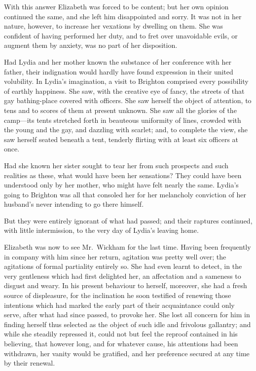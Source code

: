 With this answer Elizabeth was forced to be content; but her
own opinion continued the same, and she left him disappointed
and sorry.  It was not in her nature, however, to increase her
vexations by dwelling on them.  She was confident of having
performed her duty, and to fret over unavoidable evils, or
augment them by anxiety, was no part of her disposition.

Had Lydia and her mother known the substance of her conference
with her father, their indignation would hardly have found
expression in their united volubility.  In Lydia's imagination,
a visit to Brighton comprised every possibility of earthly
happiness.  She saw, with the creative eye of fancy, the streets
of that gay bathing-place covered with officers.  She saw
herself the object of attention, to tens and to scores of them
at present unknown.  She saw all the glories of the camp---its
tents stretched forth in beauteous uniformity of lines, crowded
with the young and the gay, and dazzling with scarlet; and, to
complete the view, she saw herself seated beneath a tent, tenderly
flirting with at least six officers at once.

Had she known her sister sought to tear her from such prospects
and such realities as these, what would have been her sensations?
They could have been understood only by her mother, who might
have felt nearly the same.  Lydia's going to Brighton was all
that consoled her for her melancholy conviction of her husband's
never intending to go there himself.

But they were entirely ignorant of what had passed; and their
raptures continued, with little intermission, to the very day of
Lydia's leaving home.

Elizabeth was now to see Mr.\ Wickham for the last time.
Having been frequently in company with him since her return,
agitation was pretty well over; the agitations of formal partiality
entirely so.  She had even learnt to detect, in the very gentleness
which had first delighted her, an affectation and a sameness to
disgust and weary.  In his present behaviour to herself,
moreover, she had a fresh source of displeasure, for the
inclination he soon testified of renewing those intentions which
had marked the early part of their acquaintance could only serve,
after what had since passed, to provoke her.  She lost all concern
for him in finding herself thus selected as the object of such idle
and frivolous gallantry; and while she steadily repressed it, could
not but feel the reproof contained in his believing, that however
long, and for whatever cause, his attentions had been withdrawn,
her vanity would be gratified, and her preference secured at any
time by their renewal.

